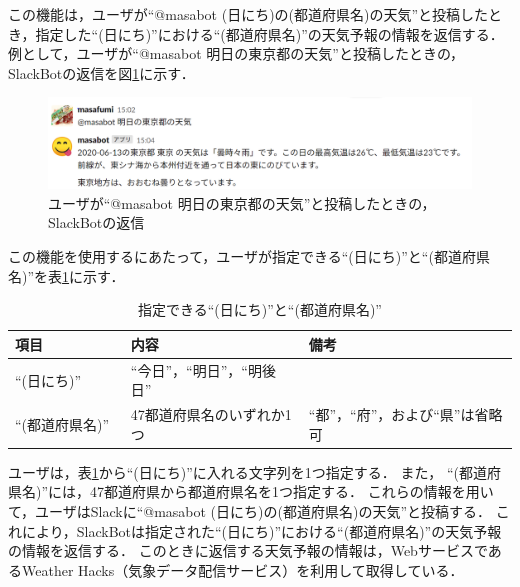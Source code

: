 \documentclass[12pt]{jsarticle}
\begin{document}
\begin{description}
  この機能は，ユーザが``@masabot (日にち)の(都道府県名)の天気''と投稿したとき，指定した``(日にち)''における``(都道府県名)''の天気予報の情報を返信する．
  例として，ユーザが``@masabot 明日の東京都の天気''と投稿したときの，SlackBotの返信を図\ref{fig:weather}に示す．
  \begin{figure}[t]
    \centering
    \includegraphics[width=1\textwidth]{figs/slackbot_weather2.png}
    \caption{ユーザが``@masabot 明日の東京都の天気''と投稿したときの，SlackBotの返信}
    \label{fig:weather}
  \end{figure}
  この機能を使用するにあたって，ユーザが指定できる``(日にち)''と``(都道府県名)''を表\ref{tab:3}に示す．
  \begin{table}[t]
  \begin{center}
    \caption{指定できる``(日にち)''と``(都道府県名)''}\label{tab:3}
    \begin{tabular}{l|l|l}
      \hline\hline
      \multicolumn{1}{l|}{項目} & \multicolumn{1}{l}{内容} &\multicolumn{1}{|l}{備考}\\
      \hline
      ``(日にち)'' & ``今日''，``明日''，``明後日'' &\\
      ``(都道府県名)''　& 47都道府県名のいずれか1つ & ``都''，``府''，および``県''は省略可\\
      \hline
    \end{tabular}
  \end{center}
  \end{table}
  ユーザは，表\ref{tab:3}から``(日にち)''に入れる文字列を1つ指定する．
  また， ``(都道府県名)''には，47都道府県から都道府県名を1つ指定する．
  これらの情報を用いて，ユーザはSlackに``@masabot (日にち)の(都道府県名)の天気''と投稿する．
  これにより，SlackBotは指定された``(日にち)''における``(都道府県名)''の天気予報の情報を返信する．
  このときに返信する天気予報の情報は，WebサービスであるWeather Hacks（気象データ配信サービス）\cite{Weather_Hacks}を利用して取得している．
\end{description}
\end{document}
